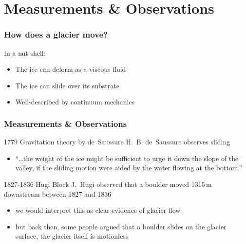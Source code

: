 \documentclass[hide notes,intlimits]{beamer}
\begin{document}


\section{Measurements \& Observations}
 
\begin{frame}
  \frametitle{How does a glacier move?}
  \begin{block}{In a nut shell:}
    \begin{itemize}
    \item The ice can deform as a viscous fluid
    \item The ice can slide over its substrate
    \item Well-described by continuum mechanics
    \end{itemize}
  \end{block}
\end{frame}


\begin{frame}
  \frametitle{Measurements \& Observations}
    \begin{block}{1779 Gravitation theory by de~Saussure}
      H.~B. de~Saussure observes sliding
      \begin{itemize}
        \item ``\ldots the weight of the ice might be sufficient to urge it down the slope of the valley, if the sliding motion were aided by the water flowing at the bottom.''
      \end{itemize}
    \end{block}
    \begin{block}{1827-1836 Hugi Block}
      J.~Hugi observed that a boulder moved $1315\,\text{m}$ downstream between 1827 and 1836
      \begin{itemize}
        \item we would interpret this as clear evidence of glacier flow
        \item but back then, some people argued that a boulder slides on the glacier surface, the glacier itself is motionless
      \end{itemize}
    \end{block}
\end{frame}
\end{document}
